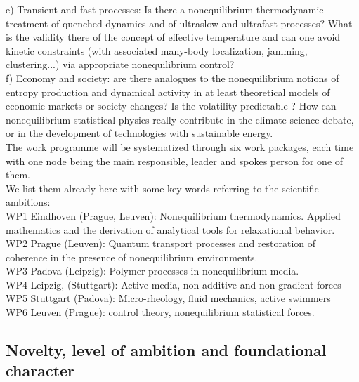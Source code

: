 e) Transient and fast processes: Is there a nonequilibrium thermodynamic treatment of quenched dynamics and of ultraslow and ultrafast processes?  What is the validity there of the concept of effective temperature and can one avoid kinetic constraints (with associated many-body localization, jamming, clustering...) via appropriate nonequilibrium control?\\
f) Economy and society: are there analogues to the nonequilibrium notions of entropy production and dynamical activity in at least theoretical models of economic markets or society changes?  Is the volatility predictable ?  How can nonequilibrium statistical physics really contribute in the climate science debate, or in the development of technologies with  sustainable energy.\\

The work programme will be systematized through six work packages, each time with one node being the main responsible, leader and spokes person for one of them.\\
We list them already here with some key-words referring to the scientific ambitions:\\
WP1 Eindhoven (Prague, Leuven): Nonequilibrium thermodynamics.  Applied mathematics and the derivation of analytical tools for relaxational behavior.\\
WP2 Prague (Leuven): Quantum transport processes and restoration of coherence in the presence of nonequilibrium environments.\\
WP3 Padova (Leipzig): Polymer processes in nonequilibrium media.\\
WP4 Leipzig, (Stuttgart):  Active media, non-additive and non-gradient forces\\
WP5 Stuttgart (Padova): Micro-rheology, fluid mechanics, active swimmers\\
WP6 Leuven (Prague): control theory, nonequilibrium statistical forces.\\

\subsection{Novelty, level of ambition and foundational character}\label{sec:progress}


